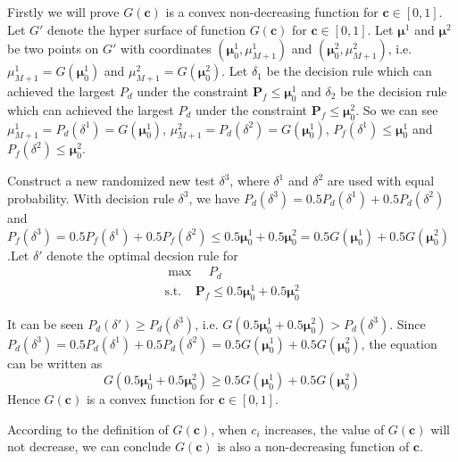 \documentclass[12pt,journal,a4paper,twoside,onecolumn]{IEEEtran}
\begin{document}
\begin{spacing}{2.5}
Firstly we will prove $G(\mathbf{c})$ is a convex non-decreasing function for $\mathbf{c} \in [0, 1]$.
Let $G'$ denote the hyper surface of function $G(\mathbf{c})$ for $\mathbf{c} \in [0,1]$. Let $\boldsymbol{\mu}^1$ and  $\boldsymbol{\mu}^2$ be two points on $G'$ with coordinates $(\boldsymbol{\mu}^1_0, \mu_{M+1}^1)$ and $(\boldsymbol{\mu}^2_0, \mu_{M+1}^2)$, i.e. $\mu_{M+1}^1 = G(\boldsymbol{\mu}_0^1)$ and $\mu_{M+1}^2 = G(\boldsymbol{\mu}_0^2)$. Let $\delta_1$ be the decision rule which can achieved the largest $P_d$ under the constraint $\mathbf{P}_f \leq \boldsymbol{\mu}_0^1$ and $\delta_2$ be the decision rule which can achieved the largest $P_d$ under the constraint $\mathbf{P}_{f} \leq \boldsymbol{\mu}_0^2$. So we can see $\mu_{M+1}^1 = P_d(\delta^1) = G(\boldsymbol{\mu}_0^1)$, $\mu_{M+1}^2 = P_d(\delta^2)=G(\boldsymbol{\mu}_0^1)$, $P_f(\delta^1) \leq \boldsymbol{\mu}^1_0$ and $P_f(\delta^2) \leq \boldsymbol{\mu}^2_0$.

Construct a new randomized new test $\delta^3$, where $\delta^1$ and $\delta^2$ are used with equal probability. With decision rule $\delta^3$, we have $P_d(\delta^3) = 0.5P_d(\delta^1)+0.5P_d(\delta^2)$ and $P_{f}(\delta^3) = 0.5P_f(\delta^1)+0.5P_f(\delta^2) \leq 0.5\boldsymbol{\mu}^1_0 + 0.5\boldsymbol{\mu}^2_0 = 0.5G(\boldsymbol{\mu}_0^1) + 0.5G(\boldsymbol{\mu}_0^2)$.Let $\delta'$ denote the optimal decsion rule for 
 \begin{equation}
 \begin{split}
 \max\;\;\;\;P_d\\
 \text{s.t.}\;\;\;\;\mathbf{P}_f \leq 0.5\boldsymbol{\mu}^1_0 + 0.5\boldsymbol{\mu}^2_0
 \end{split}
 \end{equation}

It can be seen $P_d(\delta') \geq P_d(\delta^3)$, i.e. $G(0.5\boldsymbol{\mu}^1_0 + 0.5\boldsymbol{\mu}^2_0) > P_d(\delta^3)$. Since $P_d(\delta^3) = 0.5P_d(\delta^1)+0.5P_d(\delta^2) = 0.5 G(\boldsymbol{\mu}^1_0)+ 0.5 G(\boldsymbol{\mu}^2_0)$, the equation can be written as 
\begin{equation}
G(0.5\boldsymbol{\mu}^1_0 + 0.5\boldsymbol{\mu}^2_0) \geq 0.5 G(\boldsymbol{\mu}^1_0)+ 0.5 G(\boldsymbol{\mu}^2_0)
\end{equation}
Hence $G(\mathbf{c})$ is a convex function for $\mathbf{c} \in [0, 1]$.

According to the definition of $G(\mathbf{c})$, when $c_i$ increases, the value of $G(\mathbf{c})$ will not decrease, we can conclude $G(\mathbf{c})$ is also a non-decreasing function of $\mathbf{c}$. 


\end{spacing}
\end{document}
